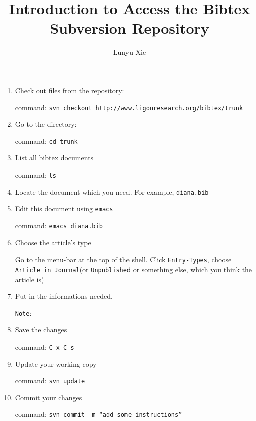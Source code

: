 \documentclass{article}
\begin{document}
\title{Introduction to Access the Bibtex Subversion Repository}
\author{Lunyu Xie}
\maketitle

\begin{enumerate}
\item{Check out files from the repository:

command: \texttt{svn checkout http://www.ligonresearch.org/bibtex/trunk}}

\item{Go to the directory:

command: \texttt{cd trunk}}


\item{List all bibtex documents

command: \texttt{ls}}


\item{Locate the document which you need. For example, \texttt{diana.bib}}


\item{Edit this document using \texttt{emacs}

command: \texttt{emacs diana.bib}}


\item{Choose the article's type

Go to the menu-bar at the top of the shell. Click \texttt{Entry-Types}, choose \texttt{Article in Journal}(or \texttt{Unpublished} or something else, which you think the article is)}

\item{Put in the informations needed.

\texttt{Note}: 




}


\item{Save the changes

command: \texttt{C-x C-s}}


\item{Update your working copy

command: \texttt{svn update}}


\item{Commit your changes

command: \texttt{svn commit -m ``add some instructions''}}

\end{enumerate}
\end{document}
